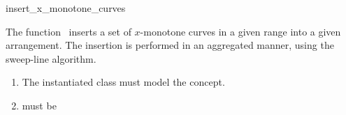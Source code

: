 \ccRefPageBegin

\begin{ccRefFunction}{insert_x_monotone_curves}

\ccDefinition

The function \ccRefName\ inserts a set of $x$-monotone curves in a given
range into a given arrangement. The insertion is performed in an aggregated
manner, using the sweep-line algorithm.



\begin{enumerate}
\item The instantiated  class must model the
   concept.
\item {} must be 
\end{enumerate}

\end{ccRefFunction}

\ccRefPageEnd
